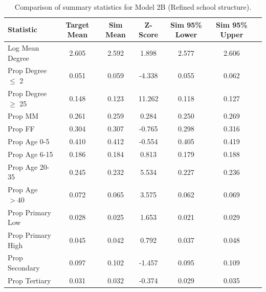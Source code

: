 \begin{table}[htbp]
    \centering
    \caption{Comparison of summary statistics for Model 2B (Refined school structure).}
    \label{tab:stats_m2b}
    \footnotesize
    \begin{tabular}{lcccccc}
        \toprule
        Statistic & Target Mean & Sim Mean & Z-Score & Sim 95\% Lower & Sim 95\% Upper \\
        \midrule
        Log Mean Degree      & 2.605 & 2.592 & 1.898 & 2.577 & 2.606 \\
        Prop Degree $\le$ 2  & 0.051 & 0.059 & -4.338 & 0.055 & 0.062 \\
        Prop Degree $\ge$ 25 & 0.148 & 0.123 & 11.262 & 0.118 & 0.127 \\
        Prop MM              & 0.261 & 0.259 & 0.284 & 0.250 & 0.269 \\
        Prop FF              & 0.304 & 0.307 & -0.765 & 0.298 & 0.316 \\
        Prop Age 0-5         & 0.410 & 0.412 & -0.554 & 0.405 & 0.419 \\
        Prop Age 6-15        & 0.186 & 0.184 & 0.813 & 0.179 & 0.188 \\
        Prop Age 20-35       & 0.245 & 0.232 & 5.534 & 0.227 & 0.236 \\
        Prop Age $> 40$      & 0.072 & 0.065 & 3.575 & 0.062 & 0.069 \\
        Prop Primary Low     & 0.028 & 0.025 & 1.653 & 0.021 & 0.029 \\
        Prop Primary High    & 0.045 & 0.042 & 0.792 & 0.037 & 0.048 \\
        Prop Secondary       & 0.097 & 0.102 & -1.457 & 0.095 & 0.109 \\
        Prop Tertiary        & 0.031 & 0.032 & -0.374 & 0.029 & 0.035 \\
        \bottomrule
    \end{tabular}
\end{table}